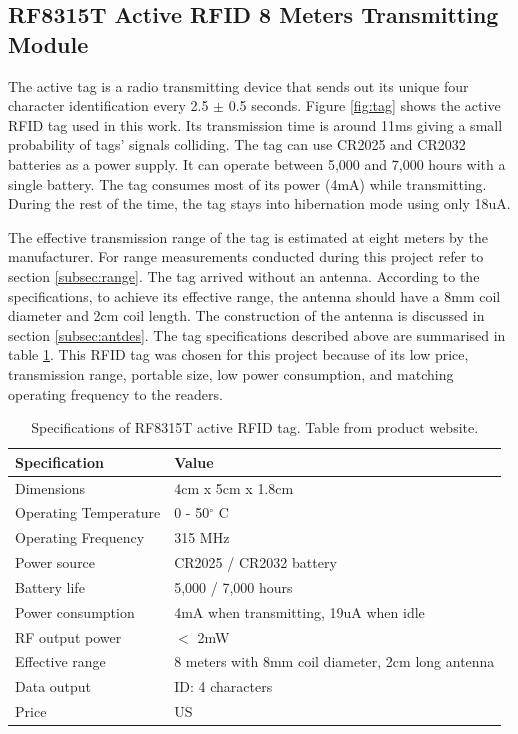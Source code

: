\subsection{RF8315T Active RFID 8 Meters Transmitting Module}

The active tag is a radio transmitting device that sends out its unique four character identification every 2.5 $\pm$ 0.5 seconds. Figure \ref{fig:tag} shows the active RFID tag used in this work. Its transmission time is around 11ms giving a small probability of tags' signals colliding. The tag can use CR2025 and CR2032 batteries as a power supply. It can operate between 5,000 and 7,000 hours with a single battery. The tag consumes most of its power (4mA) while transmitting. During the rest of the time, the tag stays into hibernation mode using only 18uA.

The effective transmission range of the tag is estimated at eight meters by the manufacturer. For range measurements conducted during this project refer to section \ref{subsec:range}. The tag arrived without an antenna. According to the specifications, to achieve its effective range, the antenna should have a 8mm coil diameter and 2cm coil length. The construction of the antenna is discussed in section \ref{subsec:antdes}. The tag specifications described above are summarised in table \ref{tbl:tag}. This RFID tag was chosen for this project because of its low price, transmission range, portable size, low power consumption, and matching operating frequency to the readers.

\begin{table}[h]
	\centering
	\begin{tabular}{ | m{4cm} || m{7cm} | }
		\hline
		\textbf{Specification}	& \textbf{Value} \\ \hline
		Dimensions				& 4cm x 5cm x 1.8cm \\ \hline
		Operating Temperature	& 0 - 50$^\circ$ C	\\ \hline
		Operating Frequency		& 315 MHz	\\ \hline
		Power source			& CR2025 / CR2032 battery \\ \hline
		Battery life			& 5,000 / 7,000 hours \\ \hline
		Power consumption		& 4mA when transmitting, 19uA when idle \\ \hline
		RF output power			& $<$ 2mW \\ \hline
		Effective range			& 8 meters with 8mm coil diameter, 2cm long antenna \\ \hline
		Data output				& ID: 4 characters \\ \hline
		Price					& US \textdollar 19.95 \\ \hline
	\end{tabular}
	\caption{Specifications of RF8315T active RFID tag. Table from product website\protect\footnotemark.}
	\label{tbl:tag}
\end{table}


